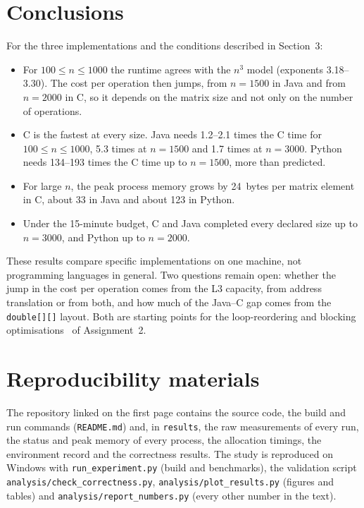 \documentclass[12pt,a4paper]{article}
\begin{document}
\section{Conclusions}

For the three implementations and the conditions described in Section~3:
\begin{itemize}
    \item For $100 \le n \le 1000$ the runtime agrees with the $n^3$ model (exponents
    3.18--3.30). The cost per operation then jumps, from $n = 1500$ in Java and from
    $n = 2000$ in C, so it depends on the matrix size and not only on the number of
    operations.
    \item C is the fastest at every size. Java needs 1.2--2.1 times the C time for
    $100 \le n \le 1000$, 5.3 times at $n = 1500$ and 1.7 times at $n = 3000$. Python
    needs 134--193 times the C time up to $n = 1500$, more than predicted.
    \item For large $n$, the peak process memory grows by 24~bytes per matrix element in
    C, about 33 in Java and about 123 in Python.
    \item Under the 15-minute budget, C and Java completed every declared size up to
    $n = 3000$, and Python up to $n = 2000$.
\end{itemize}
These results compare specific implementations on one machine, not programming languages
in general. Two questions remain open: whether the jump in the cost per operation comes
from the L3 capacity, from address translation or from both, and how much of the Java--C
gap comes from the \texttt{double[][]} layout. Both are starting points for the
loop-reordering and blocking optimisations~\cite{hennessy2019} of Assignment~2.

\section*{Reproducibility materials}

The repository linked on the first page contains the source code, the build and run
commands (\texttt{README.md}) and, in \texttt{results}, the raw measurements of every
run, the status and peak memory of every process, the allocation timings, the
environment record and the correctness results. The study is reproduced on Windows with
\texttt{run\_experiment.py} (build and benchmarks), the validation script
\texttt{analysis/check\_correctness.py}, \texttt{analysis/plot\_results.py} (figures
and tables) and \texttt{analysis/report\_numbers.py} (every other number in the text).
\end{document}
